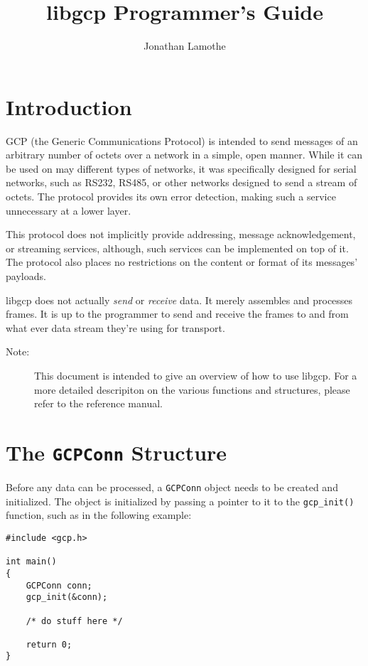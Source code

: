 \documentclass{article}
\title{libgcp Programmer's Guide}
\author{Jonathan Lamothe}
\begin{document}
\maketitle

\section{Introduction}
GCP (the Generic Communications Protocol) is intended to send messages
of an arbitrary number of octets over a network in a simple, open
manner.  While it can be used on may different types of networks, it
was specifically designed for serial networks, such as RS232, RS485,
or other networks designed to send a stream of octets.  The protocol
provides its own error detection, making such a service unnecessary at
a lower layer.

This protocol does not implicitly provide addressing, message
acknowledgement, or streaming services, although, such services can be
implemented on top of it.  The protocol also places no restrictions on
the content or format of its messages' payloads.

libgcp does not actually \emph{send} or \emph{receive} data.  It
merely assembles and processes frames.  It is up to the programmer to
send and receive the frames to and from what ever data stream they're
using for transport.

\begin{description}
\item[Note:]This document is intended to give an overview of how to
  use libgcp.  For a more detailed descripiton on the various
  functions and structures, please refer to the reference manual.
\end{description}

\section{The \texttt{GCPConn} Structure}
Before any data can be processed, a \texttt{GCPConn} object needs to
be created and initialized.  The object is initialized by passing a
pointer to it to the \texttt{gcp\_init()} function, such as in the
following example:
\begin{verbatim}
#include <gcp.h>

int main()
{
    GCPConn conn;
    gcp_init(&conn);

    /* do stuff here */

    return 0;
}
\end{verbatim}
\end{document}
